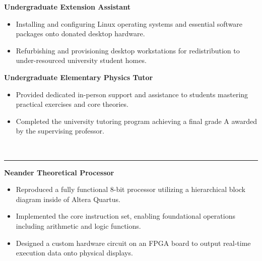 \documentclass[10pt,a4paper]{article}
\begin{document}
\noindent\textbf{Undergraduate Extension Assistant}\hfill{}\vspace{-0.5em}
\begin{itemize}[leftmargin=*]
\setlength\itemsep{0pt}
\setlength\parskip{0pt}
\setlength\parfillskip{0pt}
\item Installing and configuring Linux operating systems and essential software packages onto donated desktop hardware.
\item Refurbishing and provisioning desktop workstations for redistribution to under-resourced university student homes.
\end{itemize}

\noindent\textbf{Undergraduate Elementary Physics Tutor}\hfill{}\vspace{-0.5em}
\begin{itemize}[leftmargin=*]
\setlength\itemsep{0pt}
\setlength\parskip{0pt}
\setlength\parfillskip{0pt}
\item Provided dedicated in-person support and assistance to students mastering practical exercises and core theories.
\item Completed the university tutoring program achieving a final grade A awarded by the supervising professor.
\end{itemize}

\vspace{3pt}

\vspace{-0.6em}\\
\rule{\textwidth}{0.5pt}

\vspace{0.5em}

\noindent\textbf{Neander Theoretical Processor}\hfill{}\vspace{-0.5em}
\begin{itemize}[leftmargin=*]
\setlength\itemsep{0pt}
\setlength\parskip{0pt}
\setlength\parfillskip{0pt}
\item Reproduced a fully functional 8-bit processor utilizing a hierarchical block diagram inside of Altera Quartus.
\item Implemented the core instruction set, enabling foundational operations including arithmetic and logic functions.
\item Designed a custom hardware circuit on an FPGA board to output real-time execution data onto physical displays.
\end{itemize}
\end{document}
